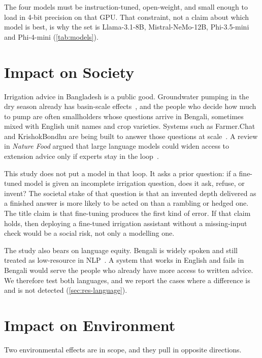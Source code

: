 The four models must be instruction-tuned, open-weight, and small enough to load in 4-bit precision on that GPU. That constraint, not a claim about which model is best, is why the set is Llama-3.1-8B, Mistral-NeMo-12B, Phi-3.5-mini and Phi-4-mini (\cref{tab:models}).

\section{Impact on Society}
\label{sec:impact-society}

Irrigation advice in Bangladesh is a public good. Groundwater pumping in the dry season already has basin-scale effects~\cite{shamsudduha2022bengal}, and the people who decide how much to pump are often smallholders whose questions arrive in Bengali, sometimes mixed with English unit names and crop varieties. Systems such as Farmer.Chat and KrishokBondhu are being built to answer those questions at scale~\cite{singh2024farmerchat,krishokbondhu2025}. A review in \emph{Nature Food} argued that large language models could widen access to extension advice only if experts stay in the loop~\cite{tzachor2023large}.

This study does not put a model in that loop. It asks a prior question: if a fine-tuned model is given an incomplete irrigation question, does it ask, refuse, or invent? The societal stake of that question is that an invented depth delivered as a finished answer is more likely to be acted on than a rambling or hedged one. The title claim is that fine-tuning produces the first kind of error. If that claim holds, then deploying a fine-tuned irrigation assistant without a missing-input check would be a social risk, not only a modelling one.

The study also bears on language equity. Bengali is widely spoken and still treated as low-resource in NLP~\cite{joshi2020state,bhattacharjee2022banglabert}. A system that works in English and fails in Bengali would serve the people who already have more access to written advice. We therefore test both languages, and we report the cases where a difference is and is not detected (\cref{sec:res-language}).

\section{Impact on Environment}
\label{sec:impact-environment}

Two environmental effects are in scope, and they pull in opposite directions.

